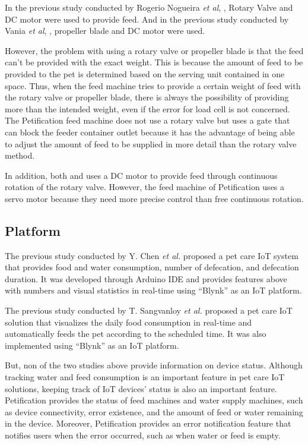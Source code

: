 \documentclass[conference]{IEEEtran}
\begin{document}
In the previous study conducted by Rogerio Nogueira \textit{et al}, \cite{b12} , Rotary Valve and DC motor were used to provide feed. And in the previous study conducted by Vania \textit{et al}, \cite{b13}, propeller blade and DC motor were used.

However, the problem with using a rotary valve or propeller blade is that the feed can’t be provided with the exact weight. This is because the amount of feed to be provided to the pet is determined based on the serving unit contained in one space. Thus, when the feed machine tries to provide a certain weight of feed with the rotary valve or propeller blade, there is always the possibility of providing more than the intended weight, even if the error for load cell is not concerned. The Petification feed machine does not use a rotary valve but uses a gate that can block the feeder container outlet because it has the advantage of being able to adjust the amount of feed to be supplied in more detail than the rotary valve method.

In addition, both \cite{b12} and \cite{b13} uses a DC motor to provide feed through continuous rotation of the rotary valve. However, the feed machine of Petification uses a servo motor because they need more precise control than free continuous rotation.\cite{b14} 

\subsection{Platform}
  The previous study conducted by Y. Chen \textit{et al.} \cite{b5}
proposed a pet care IoT system that provides food and water consumption, number of defecation, and defecation duration. It was developed through Arduino IDE and provides features above with numbers and visual statistics in real-time using “Blynk” as an IoT platform.

The previous study conducted by T. Sangvanloy \textit{et al.} \cite{b4} 
proposed a pet care IoT solution that visualizes the daily food consumption in real-time and automatically feeds the pet according to the scheduled time. It was also implemented using “Blynk” as an IoT platform.

But, non of the two studies above provide information on device status. Although tracking water and feed consumption is an important feature in pet care IoT solutions, keeping track of IoT devices’ status is also an important feature. Petification provides the status of feed machines and water supply machines, such as device connectivity, error existence, and the amount of feed or water remaining in the device. Moreover, Petification provides an error notification feature that notifies users when the error occurred, such as when water or feed is empty.
\end{document}
